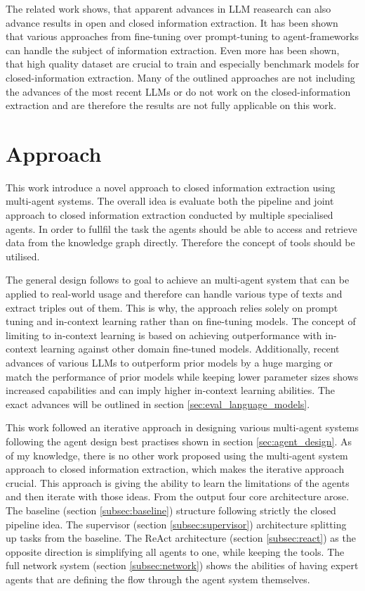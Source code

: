 \documentclass[a4paper,oneside,bibliography=totoc]{scrbook}
\begin{document}
The related work shows, that apparent advances in \ac{LLM} reasearch can also advance results in open and closed information extraction. It has been shown that various approaches from fine-tuning over prompt-tuning to agent-frameworks can handle the subject of information extraction. Even more has been shown, that high quality dataset are crucial to train and especially benchmark models for closed-information extraction. Many of the outlined approaches are not including the advances of the most recent \acp{LLM} or do not work on the closed-information extraction and are therefore the results are not fully applicable on this work.

\chapter{Approach}
\label{ch:approach}

This work introduce a novel approach to closed information extraction using multi-agent systems. The overall idea is evaluate both the pipeline and joint approach to closed information extraction conducted by multiple specialised agents. In order to fullfil the task the agents should be able to access and retrieve data from the knowledge graph directly. Therefore the concept of tools should be utilised.

The general design follows to goal to achieve an multi-agent system that can be applied to real-world usage and therefore can handle various type of texts and extract triples out of them. This is why, the approach relies solely on prompt tuning and in-context learning rather than on fine-tuning models. The concept of limiting to in-context learning is based on \citet{Brown2020} achieving outperformance with in-context learning against other domain fine-tuned models. Additionally, recent advances of various \acp{LLM} to outperform prior models by a huge marging or match the performance of prior models while keeping lower parameter sizes \cite{MetaAI2025,Chiang2024} shows increased capabilities and can imply higher in-context learning abilities. The exact advances will be outlined in section \ref{sec:eval_language_models}.

This work followed an iterative approach in designing various multi-agent systems following the agent design best practises shown in section \ref{sec:agent_design}. As of my knowledge, there is no other work proposed using the multi-agent system approach to closed information extraction, which makes the iterative approach crucial. This approach is giving the ability to learn the limitations of the agents and then iterate with those ideas. From the output four core architecture arose. The baseline (section \ref{subsec:baseline}) structure following strictly the closed pipeline idea. The supervisor (section \ref{subsec:supervisor}) architecture splitting up tasks from the baseline. The ReAct architecture (section \ref{subsec:react}) as the opposite direction is simplifying all agents to one, while keeping the tools. The full network system (section \ref{subsec:network}) shows the abilities of having expert agents that are defining the flow through the agent system themselves.
\end{document}
